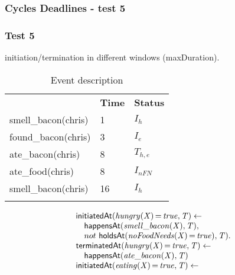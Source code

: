 \documentclass[8pt]{beamer}
\DeclareMathOperator{\val}{=}  %
\def \patsize {}
\def\happensAt{\textsf{\patsize happensAt}}
\def\holdsAt{\textsf{\patsize holdsAt}}
\def\initiatedAt{\textsf{\patsize initiatedAt}}
\def\terminatedAt{\textsf{\patsize terminatedAt}}
\newenvironment{mysplit}%
  {\arraycolsep 0pt \begin{array}{l}}%
  {\end{array}}
\begin{document}
\begin{frame}
    \frametitle{Cycles Deadlines - test 5}
    \subsubsection{Test 5}
    \small
    initiation/termination in different windows (maxDuration).\linebreak
    \begin{minipage}{0.4\linewidth}
        \begin{table}[t!]
            \caption{Event description}
            \begin{center}

                \begin{tabular}{lll}
                    \hline\noalign{\smallskip}
                    \multicolumn{1}{l}{\textbf{Event}} & \multicolumn{1}{c}{\textbf{Time}} & \multicolumn{1}{c}{\textbf{Status}} \\
                    smell\_bacon(chris)& 1 & $I_{h}$\\
                    found\_bacon(chris)& 3 & $I_{e}$\\
                    ate\_bacon(chris)& 8  & $T_{h,e}$\\
                    ate\_food(chris)& 8  & $I_{nFN}$\\
                    smell\_bacon(chris)& 16 & $I_{h}$\\
                    \noalign{\smallskip}
                    \hline
                \end{tabular}
            \end{center}
        \end{table}
    \end{minipage}
    \begin{minipage}{0.55\linewidth}
        \begin{align*}
            \begin{mysplit}
                \initiatedAt\mathit{(hungry(X)\val true,T)\leftarrow}\\
                \quad    \happensAt\mathit{(smell\_bacon(X),T),}\\
                \quad    not\ \holdsAt\mathit{(noFoodNeeds(X)\val true),T).}\\
                \terminatedAt\mathit{(hungry(X)\val true,T)\leftarrow}\\
                \quad    \happensAt\mathit{(ate\_bacon(X),T)}\\
                \initiatedAt\mathit{(eating(X)\val true,T)\leftarrow}\\

\end{mysplit}
\end{align*}
\end{minipage}
\end{frame}
\end{document}
